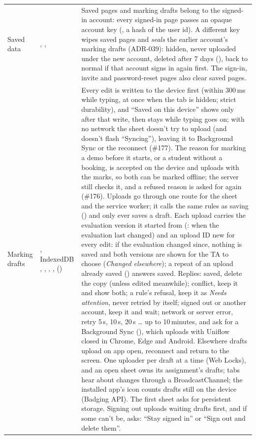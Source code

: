 {\begin{xltabular}{\linewidth}{@{}P{30mm} P{30mm} L@{}}
  Saved data & , ,  & Saved pages and marking drafts belong to the signed-in account: every signed-in page passes an opaque account key (, a hash of the user id). A different key wipes saved pages and \emph{seals} the earlier account's marking drafts (ADR-039): hidden, never uploaded under the new account, deleted after 7 days (), back to normal if that account signs in again first. The sign-in, invite and password-reset pages also clear saved pages.\\
  Marking drafts & , IndexedDB , , , ,  () & Every edit is written to the device first (within 300\,ms while typing, at once when the tab is hidden; strict durability), and ``Saved on this device'' shows only after that write, then stays while typing goes on; with no network the sheet doesn't try to upload (and doesn't flash ``Syncing''), leaving it to Background Sync or the reconnect (\#177). The reason for marking a demo before it starts, or a student without a booking, is accepted on the device and uploads with the marks, so both can be marked offline; the server still checks it, and a refused reason is asked for again (\#176). Uploads go through one route for the sheet and the service worker; it calls the same rules as saving () and only ever saves a draft. Each upload carries the evaluation version it started from (: when the evaluation last changed) and an upload ID new for every edit: if the evaluation changed since, nothing is saved and both versions are shown for the TA to choose (\emph{Changed elsewhere}); a repeat of an upload already saved () answers saved. Replies: saved, delete the copy (unless edited meanwhile); conflict, keep it and show both; a rule's refusal, keep it as \emph{Needs attention}, never retried by itself; signed out or another account, keep it and wait; network or server error, retry 5\,s, 10\,s, 20\,s \ldots{} up to 10\,minutes, and ask for a Background Sync (), which uploads with Uniflow closed in Chrome, Edge and Android. Elsewhere drafts upload on app open, reconnect and return to the screen. One uploader per draft at a time (Web Locks), and an open sheet owns its assignment's drafts; tabs hear about changes through a BroadcastChannel; the installed app's icon counts drafts still on the device (Badging API). The first sheet asks for persistent storage. Signing out uploads waiting drafts first, and if some can't be, asks: ``Stay signed in'' or ``Sign out and delete them''.\\

\end{xltabular}}
